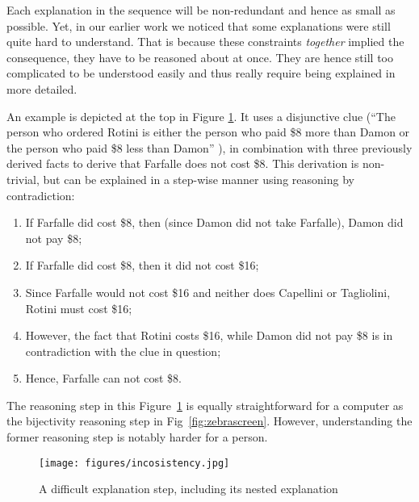Each explanation in the sequence will be non-redundant and hence as small as possible. Yet, in our earlier work we noticed that some explanations were still quite hard to understand. That is because these constraints \textit{together} implied the consequence, they have to be reasoned about at once.
They are hence still too complicated to be understood easily and thus really require being explained in more detailed.

An example is depicted at the top in Figure \ref{fig:pasta_diff}.
It uses a disjunctive clue (``The person who ordered Rotini is either the person who paid \$8 more than Damon or the person who paid \$8 less than Damon'' ), in combination with three previously derived facts to derive that Farfalle does not cost \$8.
This derivation is non-trivial, but can be explained in a step-wise manner using reasoning by contradiction:
 \begin{enumerate}
  \item If Farfalle did cost \$8, then (since Damon did not take Farfalle), Damon did not pay \$8;
  \item If Farfalle did cost \$8, then it did not cost \$16; 
  \item Since Farfalle would not cost \$16 and neither does Capellini or Tagliolini, Rotini must cost \$16;
  \item However, the fact that Rotini costs \$16, while Damon did not pay \$8 is in contradiction with the clue in question;
  \item Hence, Farfalle can not cost \$8.
 \end{enumerate}
The reasoning step in this Figure~\ref{fig:pasta_diff} is equally straightforward for a computer as the bijectivity reasoning step in Fig~\ref{fig:zebrascreen}. However, understanding the former reasoning step is notably harder for a person. %

\begin{figure}[t!]
	\centering
    \texttt{[image: figures/incosistency.jpg]}
    \caption{A difficult explanation step, including its nested explanation}\label{fig:pasta_diff}
\end{figure}

